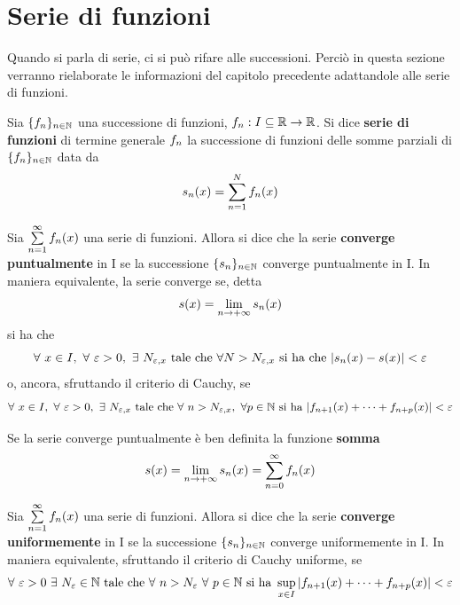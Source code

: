 \section{Serie di funzioni}
Quando si parla di serie, ci si può rifare alle successioni. Perciò in questa sezione verranno rielaborate le informazioni del capitolo precedente adattandole alle serie di funzioni.
\begin{definition}
    Sia $\{f_n\}_{n \in \mathbb{N}}$ una successione di funzioni, $f_n: I \subseteq \mathbb{R} \to \mathbb{R}$. Si dice \textbf{serie di funzioni} di termine generale $f_n$ la successione di funzioni delle somme parziali di $\{f_n\}_{n \in \mathbb{N}}$ data da
    \begin{equation}
        s_n(x)=\sum\limits_{n=1}^{N}{f_n(x)}
    \end{equation}
\end{definition}
\begin{definition}
    Sia $\sum\limits_{n=1}^{\infty}{f_n(x)}$ una serie di funzioni. Allora si dice che la serie \textbf{converge puntualmente} in I se la successione $\{s_n\}_{n \in \mathbb{N}}$ converge puntualmente in I. In maniera equivalente, la serie converge se, detta
    \begin{equation}
        s(x)=\lim_{n \to +\infty}{s_n(x)}
    \end{equation}
    si ha che
    \begin{equation}
        \forall\ x \in I,\ \forall\ \varepsilon>0,\ \exists\ N_{\varepsilon, x}\ \text{tale che}\ \forall N>N_{\varepsilon, x}\ \text{si ha che}\ |\sn(x)-s(x)|< \varepsilon
    \end{equation}
    o, ancora, sfruttando il criterio di Cauchy, se
    \begin{equation}
        \forall\ x \in I,\ \forall\ \varepsilon>0,\ \exists\ N_{\varepsilon, x}\ \text{tale che}\ \forall\ n>N_{\varepsilon, x},\ \forall p \in \N\ \text{si ha}\ |f_{n+1}(x)+ \dots+ f_{n+p}(x)|<\varepsilon
    \end{equation}
\end{definition}
\begin{definition}
    Se la serie converge puntualmente è ben definita la funzione \textbf{somma}
    \begin{equation}
        s(x)=\lim_{n \to +\infty}{s_n(x)}= \sum_{n=0}^{\infty}{f_n(x)}
    \end{equation}
\end{definition}
\begin{definition}
Sia $\sum\limits_{n=1}^{\infty}{f_n(x)}$ una serie di funzioni. Allora si dice che la serie \textbf{converge uniformemente} in I se la successione $\{s_n\}_{n \in \mathbb{N}}$ converge uniformemente in I. In maniera equivalente, sfruttando il criterio di Cauchy uniforme, se
\begin{equation}
\forall\ \varepsilon>0\ \exists\ N_\varepsilon \in \N\ \text{tale che}\ \forall\ n > N_\varepsilon\ \forall\ p \in \N\ \text{si ha}\ \sup_{x \in I}{|f_{n+1}(x)+\dots+f_{n+p}(x)|}<\varepsilon 
\end{equation}
\end{definition}
